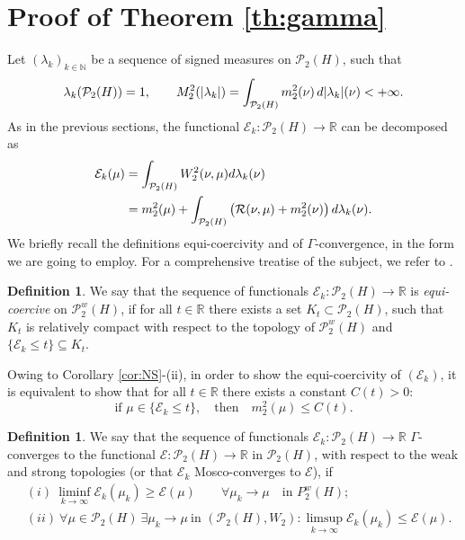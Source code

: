 \documentclass[12pt,a4paper]{article}
\newcommand{\N}{\mathbb{N}}
\newcommand{\R}{\mathbb{R}}
\renewcommand{\P}{\mathcal{P}}
\renewcommand{\d}{{\rm d}}
\newcommand{\X}{\mathcal{P}_2(H)}
\theoremstyle{plain}
\theoremstyle{definition}
\newtheorem{definition}[theorem]{Definition}
\begin{document}
\section{Proof of Theorem \ref{th:gamma}}
\label{sec:gamma}
Let $(\lambda_k)_{k\in\N}$ be a sequence of signed measures on $\X$, such that 
\[	
	\lambda_k(\X)=1,\qquad M_2^2(|\lambda_k|)=\int_{\X}m_2^2(\nu)\, \d|\lambda_k|(\nu)<+\infty.
\]
As in the previous sections, the functional $\mathcal{E}_k:\X \to \R$ can be decomposed as
\begin{align*}
	\mathcal{E}_k(\mu)&= \int_{\X} W_2^2(\nu,\mu)\d\lambda_k(\nu) \\
		&=m_2^2(\mu) + \int_{\X} \left(\mathcal R(\nu,\mu) +m_2^2(\nu)\right)\d\lambda_k(\nu).
\end{align*}
We briefly recall the definitions equi-coercivity and of $\Gamma$-convergence, in the form we are going to employ. For a comprehensive treatise of the subject, we refer to  \cite{dalmaso}.
\begin{definition}
	We say that the sequence of functionals $\mathcal{E}_k:\X \to \R$ is \emph{equi-coercive} on $\P_2^w(H)$, if for all $t\in \R$ there exists a set $K_t \subset \X$, such that $K_t$ is relatively compact with respect to the topology of $\P_2^w(H)$ and $\{\mathcal E_k \leq t\} \subseteq K_t$.
\end{definition}
Owing to Corollary \ref{cor:NS}-(ii), in order to show the equi-coercivity of $(\mathcal E_k)$, it is equivalent to show that for all $t \in \R$ there exists a constant $C(t)>0$:
\[
	\text{if }\mu \in \{\mathcal E_k \leq t\}, \quad\text{then}\quad m_2^2(\mu)\leq C(t).
\] 
\begin{definition}	
	We say that the sequence of functionals $\mathcal{E}_k:\X \to \R$ $\Gamma$-converges to the functional $\mathcal{E}:\X \to \R$ in $\X$, with respect to the weak and strong topologies (or that $\mathcal E_k$ Mosco-converges to $\mathcal E$), if
	\begin{align*}
		&(i)\ \liminf_{k \to \infty} \mathcal E_k(\mu_k) \geq \mathcal E(\mu)\qquad \forall \mu_k \to \mu\quad \text{in }P_2^w(H);\\
		&(ii)\ \forall \mu\in \X \ \exists \mu_k \to \mu\ \text{in }(\P_2(H),W_2): \limsup_{k \to \infty}\mathcal E_k(\mu_k) \leq \mathcal E(\mu).
	\end{align*}	
\end{definition}
\end{document}

